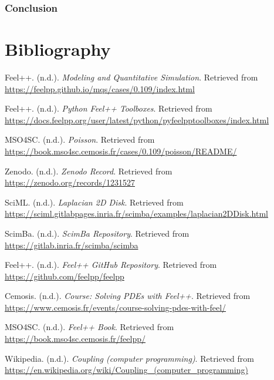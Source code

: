 \documentclass[12pt]{article}
\begin{document}
\newpage

\section{Conclusion}

\newpage

\part*{Bibliography}



\begin{thebibliography}{14}

Feel++. (n.d.). \textit{Modeling and Quantitative Simulation}. Retrieved from \url{https://feelpp.github.io/mqs/cases/0.109/index.html}

Feel++. (n.d.). \textit{Python Feel++ Toolboxes}. Retrieved from \url{https://docs.feelpp.org/user/latest/python/pyfeelpptoolboxes/index.html}

MSO4SC. (n.d.). \textit{Poisson}. Retrieved from \url{https://book.mso4sc.cemosis.fr/cases/0.109/poisson/README/}

Zenodo. (n.d.). \textit{Zenodo Record}. Retrieved from \url{https://zenodo.org/records/1231527}


SciML. (n.d.). \textit{Laplacian 2D Disk}. Retrieved from \url{https://sciml.gitlabpages.inria.fr/scimba/examples/laplacian2DDisk.html}

ScimBa. (n.d.). \textit{ScimBa Repository}. Retrieved from \url{https://gitlab.inria.fr/scimba/scimba}

Feel++. (n.d.). \textit{Feel++ GitHub Repository}. Retrieved from \url{https://github.com/feelpp/feelpp}

Cemosis. (n.d.). \textit{Course: Solving PDEs with Feel++}. Retrieved from \url{https://www.cemosis.fr/events/course-solving-pdes-with-feel/}

MSO4SC. (n.d.). \textit{Feel++ Book}. Retrieved from \url{https://book.mso4sc.cemosis.fr/feelpp/}

Wikipedia. (n.d.). \textit{Coupling (computer programming)}. Retrieved from \url{https://en.wikipedia.org/wiki/Coupling_(computer_programming)}


\end{thebibliography}
\end{document}
